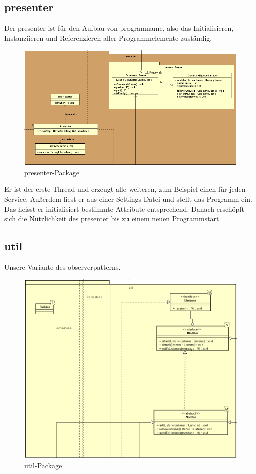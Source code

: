 \subsection{presenter}
\label{subsec:presenter}

Der presenter ist für den Aufbau von \gls{programname}, also das
Initialisieren, Instanziieren und Referenzieren aller Programmelemente zuständig.

\begin{figure}[H]
  \centering
  \includegraphics[width=\textwidth]{../diagramimages/presenter.png}
  \caption{presenter-Package}
\end{figure}

Er ist der erste Thread und erzeugt alle weiteren, zum Beispiel einen für jeden
Service. Außerdem liest er aus einer Settings-Datei und stellt das Programm ein.
Das heisst er initialisiert bestimmte Attribute entsprechend. Danach erschöpft
sich die Nützlichkeit des presenter bis zu einem neuen Programmstart.


\subsection{util}
\label{subsec:util}


Unsere Variante des \gls{observerpattern}s.

\begin{figure}[H]
  \centering
  \includegraphics[width=\textwidth]{../diagramimages/util.png}
  \caption{util-Package}
\end{figure}

